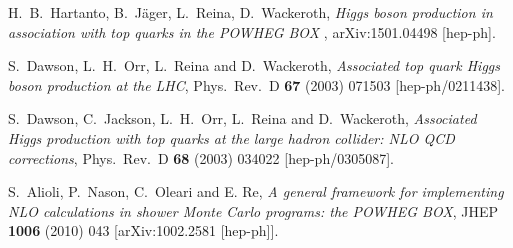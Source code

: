 \documentclass[a4paper,11pt]{article}
\begin{document}
%
\begin{thebibliography}{99}

 H.~B.~Hartanto, B.~J\"ager, L.~Reina, D.~Wackeroth, {\em Higgs boson production in association with top quarks in the POWHEG BOX }, arXiv:1501.04498 [hep-ph]. 

  S.~Dawson, L.~H.~Orr, L.~Reina and D.~Wackeroth,
  {\em Associated top quark Higgs boson production at the LHC},
  Phys.\ Rev.\ D {\bf 67} (2003) 071503
  [hep-ph/0211438]. 
  
  S.~Dawson, C.~Jackson, L.~H.~Orr, L.~Reina and D.~Wackeroth,
  {\em Associated Higgs production with top quarks at the large hadron collider: NLO QCD corrections}, 
  Phys.\ Rev.\ D {\bf 68} (2003) 034022
  [hep-ph/0305087].

 S.~Alioli, P.~Nason, C.~Oleari and E. Re, {\em
    A general framework for implementing NLO calculations in shower
    Monte Carlo programs: the POWHEG BOX}, JHEP {\bf 1006} (2010)
  043  [arXiv:1002.2581 [hep-ph]].

\end{thebibliography}
\end{document}
